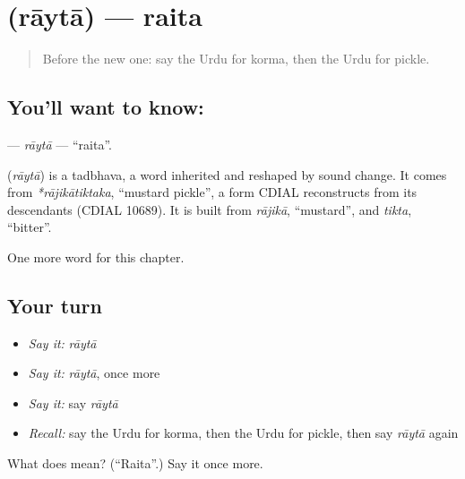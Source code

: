 \section[\texorpdfstring{\ur{رائتہ} (rāytā)}{رائتہ (rāytā)}]{ (rāytā) — raita}

\label{lesson:UR-C200-rayta}



\begin{quote}
Before the new one: say the Urdu for korma, then the Urdu for pickle.
\end{quote}

\subsection*{You'll want to know: }
\textbf{} — \emph{rāytā} — \textquotedblleft{}raita\textquotedblright{}.

\begin{cousinweb}
\textbf{} (\emph{rāytā}) is a tadbhava, a word inherited and reshaped by sound change. It comes from \emph{*rājikātiktaka}, \textquotedblleft{}mustard pickle\textquotedblright{}, a form CDIAL reconstructs from its descendants (CDIAL 10689). It is built from \emph{rājikā}, \textquotedblleft{}mustard\textquotedblright{}, and \emph{tikta}, \textquotedblleft{}bitter\textquotedblright{}.
\end{cousinweb}

\begin{grammarlens}[title={What you've built}]
One more word for this chapter.
\end{grammarlens}

\subsection*{Your turn}
\begin{itemize}
\raggedright
  \item \emph{Say it:} \emph{rāytā}
  \item \emph{Say it:} \emph{rāytā}, once more
  \item \emph{Say it:} say \emph{rāytā}
  \item \emph{Recall:} say the Urdu for korma, then the Urdu for pickle, then say \emph{rāytā} again
\end{itemize}

\begin{tcolorbox}[breakable,colback=teal!4,colframe=teal!35!black,title={Before you move on}]
What does  mean? (\textquotedblleft{}Raita\textquotedblright{}.) Say it once more.
\end{tcolorbox}
